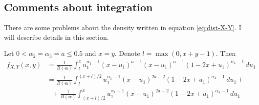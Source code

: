 \documentclass[a4paper, notitlepage, 11pt]{article}
\theoremstyle{definition}
\theoremstyle{remark}
\begin{document}
\subsection{Comments about integration}

There are some problems about the density written in equation
\eqref{eq:dist-X-Y}. I will describe details in this section. 

Let $0 < \alpha_2 = \alpha_3 = a \le 0.5$ and $x = y$. Denote $l =
\max(0,x+y-1)$. Then
\begin{equation*}
  \begin{split}
    f_{X,Y}(x,y) &= \frac{1}{B(\boldsymbol{\alpha})}\int_{l}^x u_1^{\alpha_1-1}(x-u_1)^{a-1}(x-u_1)^{a-1}(1-2x+u_1)^{\alpha_4-1} \, du_1 \\
    &= \frac{1}{B(\boldsymbol{\alpha})}\int_{l}^{(x+l)/2} u_1^{\alpha_1-1}(x-u_1)^{2a-2}(1-2x+u_1)^{\alpha_4-1} \, du_1 + \\
    &~~~+ \frac{1}{B(\boldsymbol{\alpha})}\int_{(x+l)/2}^x u_1^{\alpha_1-1}(x-u_1)^{2a-2}(1-2x+u_1)^{\alpha_4-1} \, du_1
  \end{split}
\end{equation*}


 
\end{document}
